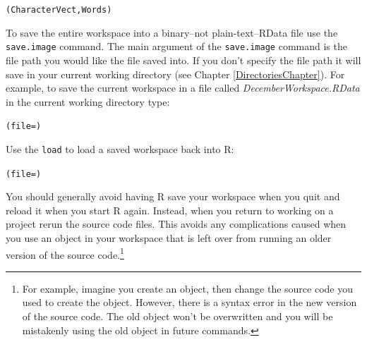 \documentclass[krantz1]{krantz}
\begin{document}
\begin{knitrout}
\color{fgcolor}\begin{kframe}
\begin{alltt}
(CharacterVect, Words)
\end{alltt}
\end{kframe}
\end{knitrout}


To save the entire workspace into a binary--not plain-text--RData file use the \texttt{save.image}\label{SaveLoadWS} command. The main argument of the \texttt{save.image} command is the file path you would like the file saved into. If you don't specify the file path it will save in your current working directory (see Chapter \ref{DirectoriesChapter}). For example, to save the current workspace in a file called \emph{DecemberWorkspace.RData} in the current working directory type:

\begin{knitrout}
\color{fgcolor}\begin{kframe}
\begin{alltt}
(file = )
\end{alltt}
\end{kframe}
\end{knitrout}


\noindent Use the \texttt{load} to load a saved workspace back into R:

\begin{knitrout}
\color{fgcolor}\begin{kframe}
\begin{alltt}
(file = )
\end{alltt}
\end{kframe}
\end{knitrout}


You should generally avoid having R save your workspace when you quit and reload it when you start R again. Instead, when you return to working on a project rerun the source code files. This avoids any complications caused when you use an object in your workspace that is left over from running an older version of the source code.\footnote{For example, imagine you create an object, then change the source code you used to create the object. However, there is a syntax error in the new version of the source code. The old object won't be overwritten and you will be mistakenly using the old object in future commands.} 
\end{document}

